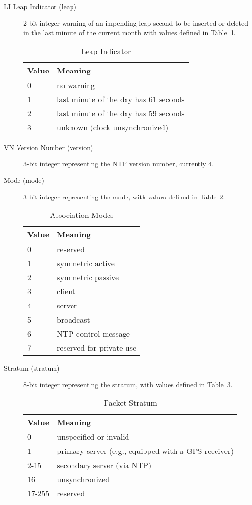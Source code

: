 \begin{description}

\item[LI Leap Indicator (leap)] 2-bit integer warning of an impending leap
second to be inserted or deleted in the last minute of the current
month with values defined in Table~\ref{leap_indicator}.

\begin{table}[htb]
\center
\begin{tabular}{| l | l |}
\hline
Value & Meaning \\
\hline
\hline
0 & no warning \\
1 & last minute of the day has 61 seconds \\
2 & last minute of the day has 59 seconds \\
3 & unknown (clock unsynchronized) \\
\hline
\end{tabular}
\caption{Leap Indicator}
\label{leap_indicator}
\end{table}

\item[VN Version Number (version)] 3-bit integer representing the NTP
version number, currently 4.

\item[Mode (mode)] 3-bit integer representing the mode, with values defined
in Table~\ref{association_modes}.

\begin{table}[htb]
\center
\begin{tabular}{| l | l |}
\hline
Value & Meaning \\
\hline
\hline
0 & reserved \\
1 & symmetric active \\
2 & symmetric passive \\
3 & client \\
4 & server \\
5 & broadcast \\
6 & NTP control message \\
7 & reserved for private use \\
\hline
\end{tabular}
\caption{Association Modes}
\label{association_modes}
\end{table}

\item[Stratum (stratum)] 8-bit integer representing the stratum, with
values defined in Table~\ref{packet_stratum}.

\begin{table}[htb]
\center
\begin{tabular}{| l | l |}
\hline
Value & Meaning \\
\hline
\hline
0 & unspecified or invalid \\
1 & primary server (e.g., equipped with a GPS receiver) \\
2-15 & secondary server (via NTP) \\
16 & unsynchronized \\
17-255 & reserved \\
\hline
\end{tabular}
\caption{Packet Stratum}
\label{packet_stratum}
\end{table}


\end{description}
